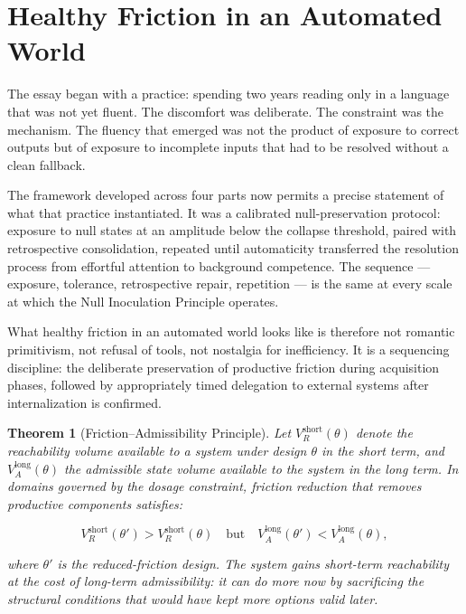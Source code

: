 \documentclass[11pt]{article}
\newtheorem{theorem}{Theorem}
\theoremstyle{remark}
\begin{document}
\section{Healthy Friction in an Automated World}
\label{sec:healthy_friction}

The essay began with a practice: spending two years reading only in a language that was not yet fluent. The discomfort was deliberate. The constraint was the mechanism. The fluency that emerged was not the product of exposure to correct outputs but of exposure to incomplete inputs that had to be resolved without a clean fallback.

The framework developed across four parts now permits a precise statement of what that practice instantiated. It was a calibrated null-preservation protocol: exposure to null states at an amplitude below the collapse threshold, paired with retrospective consolidation, repeated until automaticity transferred the resolution process from effortful attention to background competence. The sequence --- exposure, tolerance, retrospective repair, repetition --- is the same at every scale at which the Null Inoculation Principle operates.

What healthy friction in an automated world looks like is therefore not romantic primitivism, not refusal of tools, not nostalgia for inefficiency. It is a sequencing discipline: the deliberate preservation of productive friction during acquisition phases, followed by appropriately timed delegation to external systems after internalization is confirmed.

\begin{theorem}[Friction--Admissibility Principle]
\label{thm:admissibility}
Let $V_R^{\text{short}}(\theta)$ denote the reachability volume available to a system under design $\theta$ in the short term, and $V_A^{\text{long}}(\theta)$ the admissible state volume available to the system in the long term. In domains governed by the dosage constraint, friction reduction that removes productive components satisfies:

\[
V_R^{\text{short}}(\theta') > V_R^{\text{short}}(\theta)
\quad \text{but} \quad
V_A^{\text{long}}(\theta') < V_A^{\text{long}}(\theta),
\]

where $\theta'$ is the reduced-friction design. The system gains short-term reachability at the cost of long-term admissibility: it can do more now by sacrificing the structural conditions that would have kept more options valid later.
\end{theorem}
\end{document}
